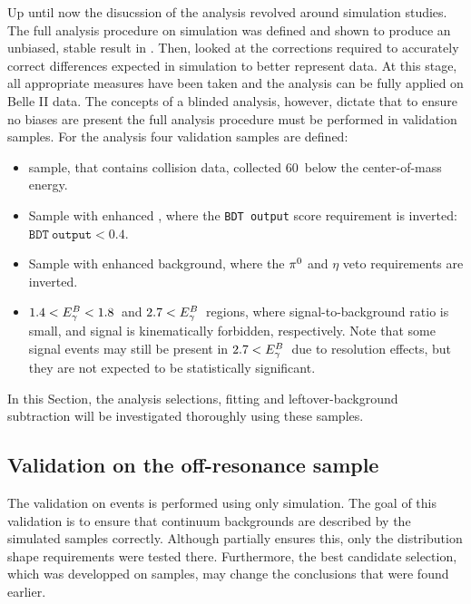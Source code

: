 Up until now the disucssion of the analysis revolved around simulation studies.
The full analysis procedure on simulation was defined and shown to produce an unbiased, stable result in .
Then,  looked at the corrections required to accurately correct differences expected in simulation to better represent data.
At this stage, all appropriate measures have been taken and the analysis can be fully applied on Belle II data.
The concepts of a blinded analysis, however, dictate that to ensure no biases are present the full analysis procedure must be performed in validation samples.
For the \BtoXsgamma analysis four validation samples are defined:
\begin{itemize}
    \item \epem\ra\qqbar sample, that contains collision data, collected 60~\mev below the \FourS center-of-mass energy.
    \item Sample with enhanced \epem\ra\qqbar, where the \texttt{BDT~output} score requirement is inverted: $\mathtt{BDT~output}<0.4$.
    \item Sample with enhanced \BB background, where the $\pi^0$ and $\eta$ veto requirements are inverted.
    \item $1.4<{E^B_{\gamma}}<1.8$~\gev and $2.7<{E^B_{\gamma}}$~\gev regions, where signal-to-background ratio is small, and signal is kinematically forbidden, respectively.
    Note that some signal events may still be present in $2.7<{E^B_{\gamma}}$~\gev due to resolution effects, but they are not expected to be statistically significant.
\end{itemize}
In this Section, the analysis selections, \Mbc fitting and leftover-\BB background subtraction will be investigated thoroughly using these samples.

\subsection{Validation on the \texorpdfstring{\epem\ra\qqbar}{e+e- -> qqbar} off-resonance sample}\label{sec:continuum_spectrum_validation}

The validation on \epem\ra\qqbar events is performed using only \epem\ra\qqbar simulation.
The goal of this validation is to ensure that continuum backgrounds are described by the simulated samples correctly.
Although  partially ensures this, only the distribution shape requirements were tested there.
Furthermore, the best candidate selection, which was developped on \BB samples, may change the conclusions that were found earlier.

